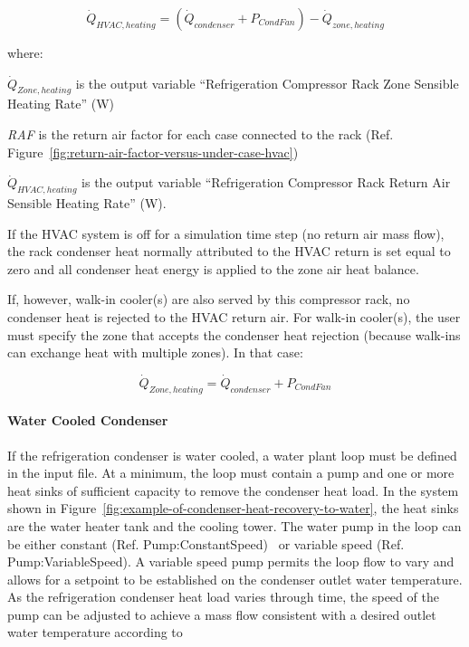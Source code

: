 \begin{equation}
{\dot Q_{HVAC,heating}} = \left( {{{\dot Q}_{condenser}} + {P_{CondFan}}} \right) - {\dot Q_{zone,heating}}
\end{equation}

where:

\({\dot Q_{Zone,heating}}\) is the output variable ``Refrigeration Compressor Rack Zone Sensible Heating Rate'' (W)

\emph{RAF} is the return air factor for each case connected to the rack (Ref. Figure~\ref{fig:return-air-factor-versus-under-case-hvac})

\({\dot Q_{HVAC,heating}}\) is the output variable ``Refrigeration Compressor Rack Return Air Sensible Heating Rate'' (W).

If the HVAC system is off for a simulation time step (no return air mass flow), the rack condenser heat normally attributed to the HVAC return is set equal to zero and all condenser heat energy is applied to the zone air heat balance.

If, however, walk-in cooler(s) are also served by this compressor rack, no condenser heat is rejected to the HVAC return air. For walk-in cooler(s), the user must specify the zone that accepts the condenser heat rejection (because walk-ins can exchange heat with multiple zones). In that case:

\begin{equation}
{\dot Q_{Zone,heating}} = {\dot Q_{condenser}} + {P_{CondFan}}
\end{equation}

\paragraph{Water Cooled Condenser}\label{water-cooled-condenser}

If the refrigeration condenser is water cooled, a water plant loop must be defined in the input file. At a minimum, the loop must contain a pump and one or more heat sinks of sufficient capacity to remove the condenser heat load. In the system shown in Figure~\ref{fig:example-of-condenser-heat-recovery-to-water}, the heat sinks are the water heater tank and the cooling tower. The water pump in the loop can be either constant (Ref. Pump:ConstantSpeed)~ or variable speed (Ref. Pump:VariableSpeed). A variable speed pump permits the loop flow to vary and allows for a setpoint to be established on the condenser outlet water temperature. As the refrigeration condenser heat load varies through time, the speed of the pump can be adjusted to achieve a mass flow consistent with a desired outlet water temperature according to

